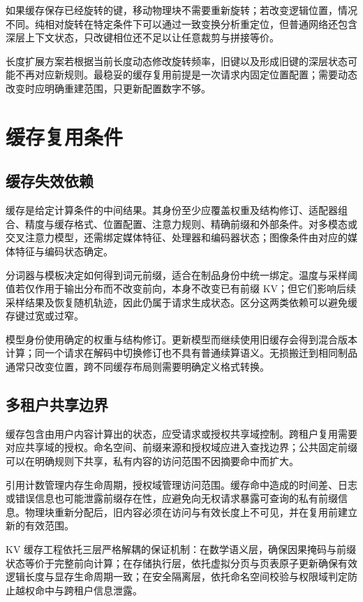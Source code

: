 \documentclass[../textbook.tex]{subfiles}
\begin{document}
如果缓存保存已经旋转的键，移动物理块不需要重新旋转；若改变逻辑位置，情况不同。纯相对旋转在特定条件下可以通过一致变换分析重定位，但普通网络还包含深层上下文状态，只改键相位还不足以让任意裁剪与拼接等价。

长度扩展方案若根据当前长度动态修改旋转频率，旧键以及形成旧键的深层状态可能不再对应新规则。最稳妥的缓存复用前提是一次请求内固定位置配置；需要动态改变时应明确重建范围，只更新配置数字不够。

\section{缓存复用条件}

\subsection{缓存失效依赖}
缓存是给定计算条件的中间结果。其身份至少应覆盖权重及结构修订、适配器组合、精度与缓存格式、位置配置、注意力规则、精确前缀和外部条件。对多模态或交叉注意力模型，还需绑定媒体特征、处理器和编码器状态；图像条件由对应的媒体特征与编码状态确定。

分词器与模板决定如何得到词元前缀，适合在制品身份中统一绑定。温度与采样阈值若仅作用于输出分布而不改变前向，本身不改变已有前缀 KV；但它们影响后续采样结果及恢复随机轨迹，因此仍属于请求生成状态。区分这两类依赖可以避免缓存键过宽或过窄。

模型身份使用确定的权重与结构修订。更新模型而继续使用旧缓存会得到混合版本计算；同一个请求在解码中切换修订也不具有普通续算语义。无损搬迁到相同制品通常只改变位置，跨不同缓存布局则需要明确定义格式转换。

\subsection{多租户共享边界}
缓存包含由用户内容计算出的状态，应受请求或授权共享域控制。跨租户复用需要对应共享域的授权。命名空间、前缀来源和授权域应进入查找边界；公共固定前缀可以在明确规则下共享，私有内容的访问范围不因摘要命中而扩大。

引用计数管理内存生命周期，授权域管理访问范围。缓存命中造成的时间差、日志或错误信息也可能泄露前缀存在性，应避免向无权请求暴露可查询的私有前缀信息。物理块重新分配后，旧内容必须在访问与有效长度上不可见，并在复用前建立新的有效范围。

\begin{note}[KV 缓存系统的正确性保证体系]
KV 缓存工程依托三层严格解耦的保证机制：在数学语义层，确保因果掩码与前缀状态等价于完整前向计算；在存储执行层，依托虚拟分页与页表原子更新确保有效逻辑长度与显存生命周期一致；在安全隔离层，依托命名空间校验与权限域判定防止越权命中与跨租户信息泄露。
\end{note}
\end{document}
